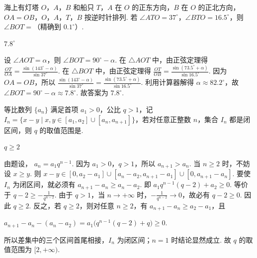\begin{problem}
海上有灯塔 \(O\)，\(A\)，\(B\) 和船只 \(T\)，\(A\) 在 \(O\) 的正东方向，\(B\) 在 \(O\) 的正北方向，\(OA=OB\)，\(O\)，\(A\)，\(T\)，\(B\) 按逆时针排列. 若 \(\angle ATO=37^\circ\)，\(\angle BTO=16.5^\circ\)，则 \(\angle BOT=\)\fillinblank{}（精确到 \(0.1^\circ\)）.

\end{problem}

\begin{answer}
\(7.8^\circ\)
\end{answer}

\begin{solution}
设 \(\angle AOT=\alpha\)，则 \(\angle BOT=90^\circ-\alpha\). 在 \(\triangle AOT\) 中，由正弦定理得
\(\frac{OT}{OA}=\frac{\sin(143^\circ-\alpha)}{\sin 37^\circ}\). 在 \(\triangle BOT\) 中，由正弦定理得
\(\frac{OT}{OB}=\frac{\sin(73.5^\circ+\alpha)}{\sin 16.5^\circ}\). 因为 \(OA=OB\)，所以
\(\frac{\sin(143^\circ-\alpha)}{\sin 37^\circ}=\frac{\sin(73.5^\circ+\alpha)}{\sin 16.5^\circ}\).
利用计算器解得 \(\alpha\approx82.2^\circ\)，故
\(\angle BOT=90^\circ-\alpha\approx7.8^\circ\).
故答案为 \(7.8^\circ\).
\end{solution}

\begin{problem}
等比数列 \(\{a_n\}\) 满足首项 \(a_1>0\)，公比 \(q>1\)，记 \(I_n=\{x-y\mid x,y\in [a_1,a_2]\cup [a_n,a_{n+1}]\}\)，若对任意正整数 \(n\)，集合 \(I_n\) 都是闭区间，则 \(q\) 的取值范围是\fillinblank{}.
\end{problem}

\begin{answer}
\(q\ge 2\)
\end{answer}

\begin{solution}
由题设，
\(a_n=a_1q^{n-1}\).
因为 \(a_1>0\)，\(q>1\)，所以 \(a_{n+1}>a_n\). 当 \(n\ge 2\) 时，不妨设 \(x\ge y\). 则
\(x-y\in [0,a_2-a_1]\cup [a_n-a_2,a_{n+1}-a_1]\cup [0,a_{n+1}-a_n]\).
要使 \(I_n\) 为闭区间，就必须有
\(a_{n+1}-a_n\ge a_n-a_2\).
即
\(a_1q^{n-1}(q-2)+a_2\ge 0\).
等价于
\(q-2\ge -\frac{1}{q^{n-2}}\).
由于 \(q>1\)，当 \(n\to +\infty\) 时，\(-\frac{1}{q^{n-2}}\to 0\)，故必有
\(q-2\ge 0\).
因此
\(q\ge 2\).
反之，若 \(q\ge 2\)，则对任意 \(n\ge 2\)，有
\(a_{n+1}-a_n\ge a_2-a_1\)，且

\(a_{n+1}-a_n-(a_n-a_2)=a_1\bigl(q^{n-1}(q-2)+q\bigr)\ge 0\).

所以差集中的三个区间首尾相接，\(I_n\) 为闭区间；\(n=1\) 时结论显然成立. 故 \(q\) 的取值范围为 \([2,+\infty)\).
\end{solution}
